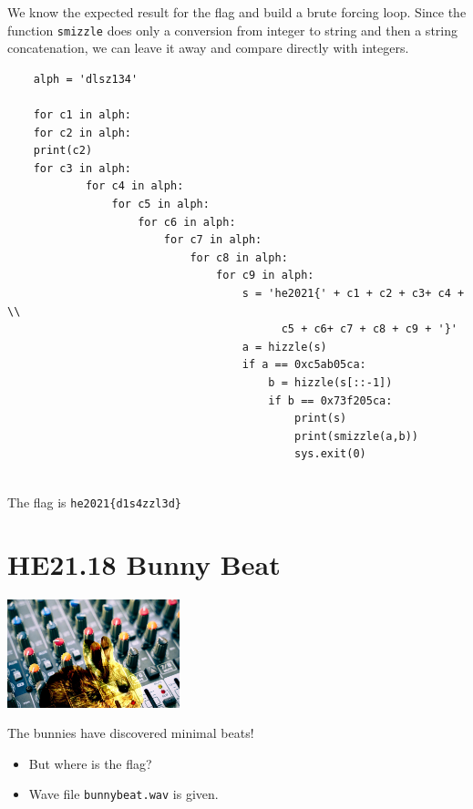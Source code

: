 \documentclass[english,a4paper,nols,noindent]{tufte-handout}
\begin{document}
  We know the expected result for the flag and build a brute forcing
  loop.  Since the function \verb+smizzle+ does only a conversion from
  integer to string and then a string concatenation, we can leave it
  away and compare directly with integers.

  \begin{verbatim}
    alph = 'dlsz134'
    
    for c1 in alph:
    for c2 in alph:
    print(c2)
    for c3 in alph:
            for c4 in alph:
                for c5 in alph:
                    for c6 in alph:
                        for c7 in alph:
                            for c8 in alph:
                                for c9 in alph:
                                    s = 'he2021{' + c1 + c2 + c3+ c4 + \\
                                          c5 + c6+ c7 + c8 + c9 + '}'
                                    a = hizzle(s)
                                    if a == 0xc5ab05ca:
                                        b = hizzle(s[::-1])
                                        if b == 0x73f205ca:
                                            print(s)
                                            print(smizzle(a,b))
                                            sys.exit(0)
  
  \end{verbatim}

The flag is \verb+he2021{d1s4zzl3d}+

\hypertarget{he21.18}{%
  \section{HE21.18 Bunny Beat}
  \label{he21.18}}
\begin{marginfigure}
    \includegraphics[width=50mm]{images/challenge18.jpg}
\end{marginfigure}

\noindent The bunnies have discovered minimal beats!

\begin{itemize}
\item But where is the flag?
\item Wave file \verb+bunnybeat.wav+ is given.
\end{itemize}
\end{document}
